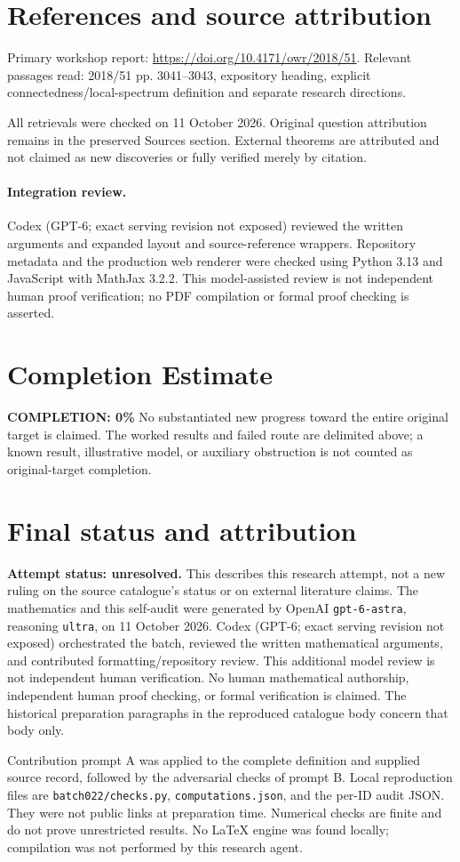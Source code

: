 \documentclass[11pt]{article}
\begin{document}
\section{References and source attribution}
Primary workshop report: \url{https://doi.org/10.4171/owr/2018/51}. Relevant passages read: 2018/51 pp. 3041--3043, expository heading, explicit connectedness/local-spectrum definition and separate research directions.

All retrievals were checked on 11 October 2026. Original question attribution remains in the preserved Sources section. External theorems are attributed and not claimed as new discoveries or fully verified merely by citation.


\paragraph{Integration review.} Codex (GPT-6; exact serving revision not exposed) reviewed the written arguments and expanded layout and source-reference wrappers. Repository metadata and the production web renderer were checked using Python 3.13 and JavaScript with MathJax 3.2.2. This model-assisted review is not independent human proof verification; no PDF compilation or formal proof checking is asserted.

\section{Completion Estimate}
\noindent\textbf{COMPLETION: 0\%}
No substantiated new progress toward the entire original target is claimed. The worked results and failed route are delimited above; a known result, illustrative model, or auxiliary obstruction is not counted as original-target completion.

\section{Final status and attribution}
\textbf{Attempt status: unresolved.} This describes this research attempt, not a new ruling on the source catalogue's status or on external literature claims.
The mathematics and this self-audit were generated by OpenAI \texttt{gpt-6-astra}, reasoning \texttt{ultra}, on 11 October 2026. Codex (GPT-6; exact serving revision not exposed) orchestrated the batch, reviewed the written mathematical arguments, and contributed formatting/repository review. This additional model review is not independent human verification. No human mathematical authorship, independent human proof checking, or formal verification is claimed. The historical preparation paragraphs in the reproduced catalogue body concern that body only.

Contribution prompt A was applied to the complete definition and supplied source record, followed by the adversarial checks of prompt B. Local reproduction files are \texttt{batch022/checks.py}, \texttt{computations.json}, and the per-ID audit JSON. They were not public links at preparation time. Numerical checks are finite and do not prove unrestricted results. No LaTeX engine was found locally; compilation was not performed by this research agent.
\end{document}
